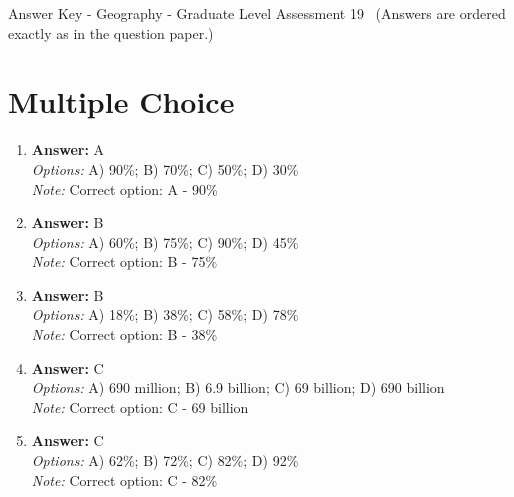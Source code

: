 \documentclass[12pt]{article}
\begin{document}
\begin{center}
Answer Key - Geography - Graduate Level Assessment 19 \
\small (Answers are ordered exactly as in the question paper.)
\end{center}

\section*{Multiple Choice}
\begin{enumerate}[label=\arabic*.]
\item \textbf{Answer:} A
\\ \textit{Options:} A) 90\%; B) 70\%; C) 50\%; D) 30\%
\\ \textit{Note:} Correct option: A - 90\%
\item \textbf{Answer:} B
\\ \textit{Options:} A) 60\%; B) 75\%; C) 90\%; D) 45\%
\\ \textit{Note:} Correct option: B - 75\%
\item \textbf{Answer:} B
\\ \textit{Options:} A) 18\%; B) 38\%; C) 58\%; D) 78\%
\\ \textit{Note:} Correct option: B - 38\%
\item \textbf{Answer:} C
\\ \textit{Options:} A) 690 million; B) 6.9 billion; C) 69 billion; D) 690 billion
\\ \textit{Note:} Correct option: C - 69 billion
\item \textbf{Answer:} C
\\ \textit{Options:} A) 62\%; B) 72\%; C) 82\%; D) 92\%
\\ \textit{Note:} Correct option: C - 82\%
\end{enumerate}
\end{document}

